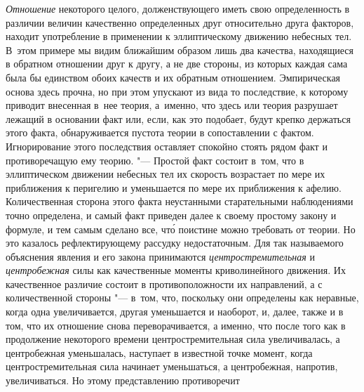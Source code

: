 {\em Отношение} некоторого целого, долженствующего иметь свою определенность в
различии величин качественно определенных друг относительно друга факторов,
находит употребление в применении к эллиптическому движению небесных тел.
В~этом примере мы видим ближайшим образом лишь два качества, находящиеся в
обратном отношении друг к другу, а не две стороны, из которых каждая сама была
бы единством обоих качеств и их обратным отношением. Эмпирическая основа здесь
прочна, но при этом упускают из вида то последствие, к которому приводит
внесенная в~нее теория, а~именно, что здесь или теория разрушает лежащий в
основании факт или, если, как это подобает, будут крепко держаться этого факта,
обнаруживается пустота теории в сопоставлении с фактом. Игнорирование этого
последствия оставляет спокойно стоять рядом факт и противоречащую ему теорию.
"--- Простой факт состоит в~том, что в эллиптическом движении небесных тел их
скорость возрастает по мере их приближения к перигелию и уменьшается по мере их
приближения к афелию. Количественная сторона этого факта неустанными
старательными наблюдениями точно определена, и самый факт приведен далее к
своему простому закону и формуле, и тем самым сделано все, чт\'{о} поистине
можно требовать от теории. Но это казалось рефлектирующему рассудку
недостаточным. Для так называемого объяснения явления и его закона принимаются
{\em центростремительная} и {\em центробежная} силы как качественные моменты
криволинейного движения. Их качественное различие состоит в противоположности
их направлений, а с количественной стороны "--- в~том, что, поскольку они
определены как неравные, когда одна увеличивается, другая уменьшается и
наоборот, и, далее, также и в том, что их отношение снова переворачивается, а
именно, что после того как в продолжение некоторого времени центростремительная
сила увеличивалась, а центробежная уменьшалась, наступает в известной точке
момент, когда центростремительная сила начинает уменьшаться, а центробежная,
напротив, увеличиваться. Но этому представлению противоречит
